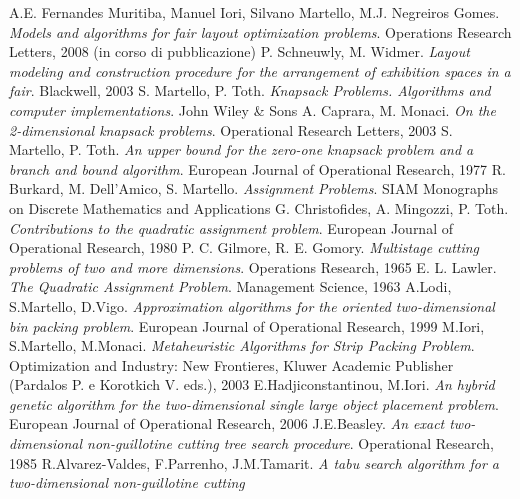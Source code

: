 \documentclass[12pt,a4paper,openright,twoside]{report}
\begin{document}
\newpage
\clearpage{\pagestyle{empty}\cleardoublepage}
\begin{thebibliography}{40}
 A.E. Fernandes Muritiba, Manuel Iori, Silvano Martello, M.J. Negreiros Gomes. \emph{Models and algorithms for fair layout optimization problems}. Operations Research Letters, 2008 (in corso di pubblicazione)
 P. Schneuwly, M. Widmer. \emph{Layout modeling and construction procedure for the arrangement of exhibition spaces in a fair}. Blackwell, 2003
 S. Martello, P. Toth. \emph{Knapsack Problems. Algorithms and computer implementations}. John Wiley \& Sons
 A. Caprara, M. Monaci. \emph{On the 2-dimensional knapsack problems}. Operational Research Letters, 2003
 S. Martello, P. Toth. \emph{An upper bound for the zero-one knapsack problem and a branch and
bound algorithm}. European Journal of Operational Research, 1977 
 R. Burkard, M. Dell'Amico, S. Martello. \emph{Assignment Problems}. SIAM Monographs on Discrete Mathematics and Applications
 G. Christofides, A. Mingozzi, P. Toth. \emph{Contributions to the quadratic assignment problem}. European Journal of Operational Research, 1980 
 P. C. Gilmore, R. E. Gomory. \emph{Multistage cutting problems of two and more dimensions}. Operations Research, 1965
 E. L. Lawler. \emph{The Quadratic Assignment Problem}. Management Science, 1963
 A.Lodi, S.Martello, D.Vigo. \emph{Approximation algorithms for the oriented two-dimensional bin packing
problem}. European Journal of Operational Research, 1999
 M.Iori, S.Martello, M.Monaci. \emph{Metaheuristic Algorithms for Strip Packing Problem}. Optimization and Industry: New Frontieres, Kluwer Academic Publisher (Pardalos P. e Korotkich V. eds.), 2003
 E.Hadjiconstantinou, M.Iori. \emph{An hybrid genetic algorithm for the two-dimensional single large object placement problem}. European Journal of Operational Research, 2006
 J.E.Beasley. \emph{An exact two-dimensional non-guillotine cutting tree search procedure}. Operational Research, 1985
 R.Alvarez-Valdes, F.Parrenho, J.M.Tamarit. \emph{A tabu search algorithm for a two-dimensional non-guillotine cutting
}
\end{thebibliography}
\end{document}
